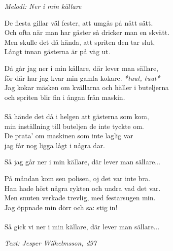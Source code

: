 {\footnotesize\textit{Melodi: Ner i min källare}}\par
\vspace{10pt}
De flesta gillar väl fester, att umgås på nått sätt.\\
Och ofta när man har gäster så dricker man en skvätt.\\
Men skulle det då hända, att spriten den tar slut,\\
Långt innan gästerna är på väg ut.\par
\vspace{10pt}
Då går jag ner i min källare, där lever man sällare,\\
för där har jag kvar min gamla kokare. \textit{*tuut, tuut*}\\
Jag kokar mäsken om kvällarna och häller i buteljerna \\
och spriten blir fin i ångan från maskin.\\
\\
Så hände det då i helgen att gästerna som kom, \\
min inställning till buteljen de inte tyckte om.\\
De prata' om maskinen som inte laglig var\\
jag får nog ligga lågt i några dar.\par
\vspace{10pt}
Så jag går ner i min källare, där lever man sällare...\par
\vspace{10pt}
På måndan kom sen polisen, oj det var inte bra.\\
Han hade hört några rykten och undra vad det var.\\
Men snuten verkade trevlig, med festarsugen min.\\
Jag öppnade min dörr och sa: stig in!\\
\\
Så gick vi ner i min källare, där lever man sällare...
\par
\vspace{10pt}
{\footnotesize\textit{Text: Jesper Wilhelmsson, d97}}
